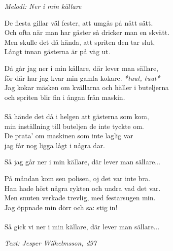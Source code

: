 {\footnotesize\textit{Melodi: Ner i min källare}}\par
\vspace{10pt}
De flesta gillar väl fester, att umgås på nått sätt.\\
Och ofta när man har gäster så dricker man en skvätt.\\
Men skulle det då hända, att spriten den tar slut,\\
Långt innan gästerna är på väg ut.\par
\vspace{10pt}
Då går jag ner i min källare, där lever man sällare,\\
för där har jag kvar min gamla kokare. \textit{*tuut, tuut*}\\
Jag kokar mäsken om kvällarna och häller i buteljerna \\
och spriten blir fin i ångan från maskin.\\
\\
Så hände det då i helgen att gästerna som kom, \\
min inställning till buteljen de inte tyckte om.\\
De prata' om maskinen som inte laglig var\\
jag får nog ligga lågt i några dar.\par
\vspace{10pt}
Så jag går ner i min källare, där lever man sällare...\par
\vspace{10pt}
På måndan kom sen polisen, oj det var inte bra.\\
Han hade hört några rykten och undra vad det var.\\
Men snuten verkade trevlig, med festarsugen min.\\
Jag öppnade min dörr och sa: stig in!\\
\\
Så gick vi ner i min källare, där lever man sällare...
\par
\vspace{10pt}
{\footnotesize\textit{Text: Jesper Wilhelmsson, d97}}
